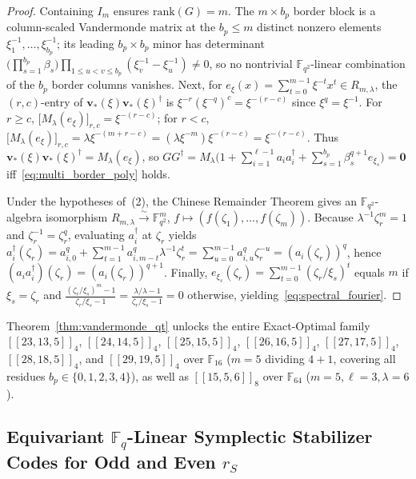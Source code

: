 \documentclass[11pt,a4paper]{article}
\newcommand{\vb}[1]{\symbf{#1}}
\newcommand{\vb}[1]{\mathbf{#1}}
\theoremstyle{remark}
\begin{document}
\begin{proof}
Containing $I_m$ ensures $\mathrm{rank}(G) = m$. The $m \times b_p$ border block is a column-scaled Vandermonde matrix at the $b_p \le m$ distinct nonzero elements $\xi_1^{-1}, \dots, \xi_{b_p}^{-1}$; its leading $b_p \times b_p$ minor has determinant $\bigl(\prod_{s=1}^{b_p} \beta_s\bigr) \prod_{1 \le u < v \le b_p} (\xi_v^{-1} - \xi_u^{-1}) \ne 0$, so no nontrivial $\mathbb{F}_{q^2}$-linear combination of the $b_p$ border columns vanishes. Next, for $e_\xi(x) = \sum_{t=0}^{m-1} \xi^{-t} x^t \in R_{m,\lambda}$, the $(r, c)$-entry of $\vb{v}_*(\xi)\vb{v}_*(\xi)^\dagger$ is $\xi^{-r} (\xi^{-q})^c = \xi^{-(r-c)}$ since $\xi^q = \xi^{-1}$. For $r \ge c$, $\bigl[M_\lambda(e_\xi)\bigr]_{r,c} = \xi^{-(r-c)}$; for $r < c$, $\bigl[M_\lambda(e_\xi)\bigr]_{r,c} = \lambda \xi^{-(m+r-c)} = (\lambda \xi^{-m})\xi^{-(r-c)} = \xi^{-(r-c)}$. Thus $\vb{v}_*(\xi)\vb{v}_*(\xi)^\dagger = M_\lambda(e_\xi)$, so $G G^\dagger = M_\lambda\bigl(1 + \sum_{i=1}^{\ell-1} a_i a_i^\dagger + \sum_{s=1}^{b_p} \beta_s^{q+1} e_{\xi_s}\bigr) = \vb{0}$ iff~\eqref{eq:multi_border_poly} holds.

Under the hypotheses of~(2), the Chinese Remainder Theorem gives an $\mathbb{F}_{q^2}$-algebra isomorphism $R_{m,\lambda} \xrightarrow{\sim} \mathbb{F}_{q^2}^m$, $f \mapsto (f(\zeta_1), \dots, f(\zeta_m))$. Because $\lambda^{-1} \zeta_r^m = 1$ and $\zeta_r^{-1} = \zeta_r^q$, evaluating $a_i^\dagger$ at $\zeta_r$ yields $a_i^\dagger(\zeta_r) = a_{i,0}^q + \sum_{t=1}^{m-1} a_{i,m-t}^q \lambda^{-1} \zeta_r^t = \sum_{u=0}^{m-1} a_{i,u}^q \zeta_r^{-u} = (a_i(\zeta_r))^q$, hence $(a_i a_i^\dagger)(\zeta_r) = (a_i(\zeta_r))^{q+1}$. Finally, $e_{\xi_s}(\zeta_r) = \sum_{t=0}^{m-1} (\zeta_r / \xi_s)^t$ equals $m$ if $\xi_s = \zeta_r$ and $\frac{(\zeta_r/\xi_s)^m - 1}{\zeta_r/\xi_s - 1} = \frac{\lambda/\lambda - 1}{\zeta_r/\xi_s - 1} = 0$ otherwise, yielding~\eqref{eq:spectral_fourier}.
\end{proof}

Theorem~\ref{thm:vandermonde_qt} unlocks the entire Exact-Optimal family $[[23,13,5]]_4$, $[[24,14,5]]_4$, $[[25,15,5]]_4$, $[[26,16,5]]_4$, $[[27,17,5]]_4$, $[[28,18,5]]_4$, and $[[29,19,5]]_4$ over $\mathbb{F}_{16}$ ($m = 5$ dividing $4 + 1$, covering all residues $b_p \in \{0, 1, 2, 3, 4\}$), as well as $[[15,5,6]]_8$ over $\mathbb{F}_{64}$ ($m = 5, \ell = 3, \lambda = 6$).

\subsection{Equivariant \texorpdfstring{$\mathbb{F}_q$}{GF(q)}-Linear Symplectic Stabilizer Codes for Odd and Even \texorpdfstring{$r_S$}{r\_S}}
\end{document}

